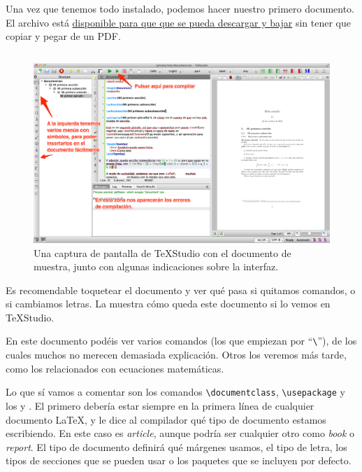 Una vez que tenemos todo instalado, podemos hacer nuestro primero documento. El archivo está \href{https://github.com/VicdeJuan/Apuntes/blob/master/Cosas%20guays%20LaTeX/Manual/DocumentoMuestra.tex}{disponible para que que se pueda descargar y bajar} sin tener que copiar y pegar de un PDF.

\inputminted[linenos,tabsize=2,fontsize=\footnotesize, breaklines]{latex}{tex/DocumentoMuestra.tex}

\begin{figure}[hbtp]
\centering
\includegraphics[width=\textwidth]{TeXStudio.png}
\caption{Una captura de pantalla de TeXStudio con el documento de muestra, junto con algunas indicaciones sobre la interfaz.}
\label{fig:TeXStudio}
\end{figure}

Es recomendable toquetear el documento y ver qué pasa si quitamos comandos, o si cambiamos letras. La  muestra cómo queda este documento si lo vemos en TeXStudio.

En este documento podéis ver varios comandos (los que empiezan por ``\verb|\|''), de los cuales muchos no merecen demasiada explicación. Otros los veremos más tarde, como los relacionados con ecuaciones matemáticas.

Lo que sí vamos a comentar son los comandos \verb|\documentclass|, \verb|\usepackage|  y los \verb|| y \verb||. El primero debería estar siempre en la primera línea de cualquier documento \LaTeX, y le dice al compilador qué tipo de documento estamos escribiendo. En este caso es \textit{article}, aunque podría ser cualquier otro como \textit{book} o \textit{report}. El tipo de documento definirá qué márgenes usamos, el tipo de letra, los tipos de secciones que se pueden usar o los paquetes que se incluyen por defecto.

